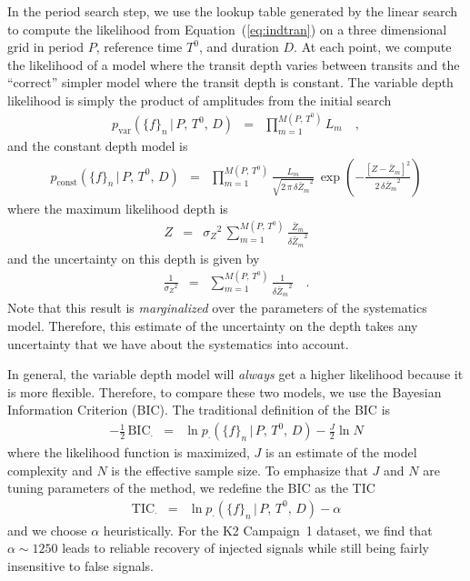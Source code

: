 \documentclass[12pt,preprint]{aastex}
\newcommand{\Eq}[1]{Equation~(\ref{eq:#1})}
\newcommand{\eq}[1]{\Eq{#1}}
\newcommand{\eqlabel}[1]{\label{eq:#1}}
\newcommand{\BIC}{{\ensuremath{\mathrm{BIC}}}}
\newcommand{\TIC}{{\ensuremath{\mathrm{TIC}}}}
\newcommand{\flux}{{\ensuremath{f}}}
\newcommand{\period}{{\ensuremath{P}}}
\newcommand{\phase}{{\ensuremath{T^0}}}
\newcommand{\duration}{{\ensuremath{D}}}
\newcommand{\depth}{{\ensuremath{Z}}}
\begin{document}
In the period search step, we use the lookup table generated by the linear
search to compute the likelihood from \eq{indtran} on a three dimensional
grid in period \period, reference time \phase, and duration \duration.
At each point, we compute the likelihood of a model where the transit depth
varies between transits and the ``correct'' simpler model where the transit
depth is constant.
The variable depth likelihood is simply the product of amplitudes from the
initial search
\begin{eqnarray}
p_\mathrm{var}(\{\flux\}_n\,|\,\period,\,\phase,\,\duration) &=&
\prod_{m=1}^{M(\period,\,\phase)} L_m \quad,
\end{eqnarray}
and the constant depth model is
\begin{eqnarray}
p_\mathrm{const}(\{\flux\}_n\,|\,\period,\,\phase,\,\duration) &=&
\prod_{m=1}^{M(\period,\,\phase)}
    \frac{L_m}{\sqrt{2\,\pi\,{\delta\bar{\depth}_m}^2}}\,\exp \left(
        -\frac{[\depth - \bar{\depth}_m]^2}{2\,{\delta\bar{\depth}_m}^2}
    \right)
\end{eqnarray}
where the maximum likelihood depth is
\begin{eqnarray}\eqlabel{periodic-depth}
\depth &=& {\sigma_\depth}^2\,\sum_{m=1}^{M(\period,\,\phase)}
    \frac{\bar{\depth}_m}{{\delta\bar{\depth}_m}^2}
\end{eqnarray}
and the uncertainty on this depth is given by
\begin{eqnarray}\eqlabel{periodic-depth-uncert}
\frac{1}{{\sigma_\depth}^2} &=& \sum_{m=1}^{M(\period,\,\phase)}
    \frac{1}{{\delta\bar{\depth}_m}^2} \quad.
\end{eqnarray}
Note that this result is \emph{marginalized} over the parameters of the
systematics model.
Therefore, this estimate of the uncertainty on the depth takes any
uncertainty that we have about the systematics into account.

In general, the variable depth model will \emph{always} get a higher
likelihood because it is more flexible.
Therefore, to compare these two models, we use the Bayesian Information
Criterion (BIC).
The traditional definition of the BIC is
\begin{eqnarray}
-\frac{1}{2}\,\BIC_\cdot &=&
    \ln p_\cdot(\{\flux\}_n\,|\,\period,\,\phase,\,\duration)
    - \frac{J}{2} \ln N
\end{eqnarray}
where the likelihood function is maximized, $J$ is an estimate of the model
complexity and $N$ is the effective sample size.
To emphasize that $J$ and $N$ are tuning parameters of the method, we
redefine the BIC as the TIC
\begin{eqnarray}
\TIC_\cdot &=&
    \ln p_\cdot(\{\flux\}_n\,|\,\period,\,\phase,\,\duration) - \alpha
\end{eqnarray}
and we choose $\alpha$ heuristically.
For the K2 Campaign~1 dataset, we find that $\alpha \sim 1250$ leads to reliable
recovery of injected signals while still being fairly insensitive to false
signals.
\end{document}
